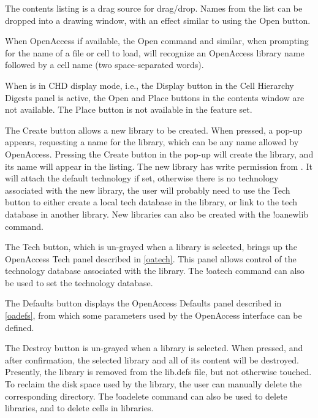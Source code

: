 The contents listing is a drag source for drag/drop.  Names from the
list can be dropped into a drawing window, with an effect similar to
using the {\cb Open} button.

When OpenAccess if available, the {\cb Open} command and similar, when
prompting for the name of a file or cell to load, will recognize an
OpenAccess library name followed by a cell name (two space-separated
words).

When {\Xic} is in CHD display mode, i.e., the {\cb Display} button in
the {\cb Cell Hierarchy Digests} panel is active, the {\cb Open} and
{\cb Place} buttons in the contents window are not available.  The
{\cb Place} button is not available in the {\Xiv} feature set.

The {\cb Create} button allows a new library to be created.  When
pressed, a pop-up appears, requesting a name for the library, which
can be any name allowed by OpenAccess.  Pressing the {\cb Create}
button in the pop-up will create the library, and its name will appear
in the listing.  The new library has write permission from {\Xic}.  It
will attach the default technology if set, otherwise there is no
technology associated with the new library, the user will probably
need to use the {\cb Tech} button to either create a local tech
database in the library, or link to the tech database in another
library.  New libraries can also be created with the {\cb !oanewlib}
command.

The {\cb Tech} button, which is un-grayed when a library is selected,
brings up the {\cb OpenAccess Tech} panel described in \ref{oatech}. 
This panel allows control of the technology database associated with
the library.  The {\cb !oatech} command can also be used to set the
technology database.

The {\cb Defaults} button displays the {\cb OpenAccess Defaults} panel
described in \ref{oadefs}, from which some parameters used by the
OpenAccess interface can be defined.

The {\cb Destroy} button is un-grayed when a library is selected. 
When pressed, and after confirmation, the selected library and all of
its content will be destroyed.  Presently, the library is removed from
the {\vt lib.defs} file, but not otherwise touched.  To reclaim the
disk space used by the library, the user can manually delete the
corresponding directory.  The {\cb !oadelete} command can also be used
to delete libraries, and to delete cells in libraries.

